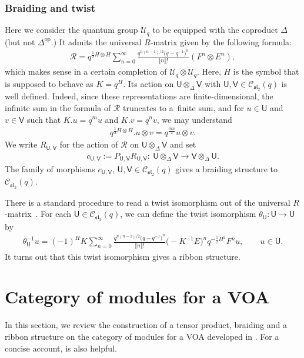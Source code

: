 \documentclass[pdftex]{sigma}
\numberwithin{equation}{section}
\newcommand{\op}{\mathrm{op}}
\newcommand{\cC}{\mathcal{C}}
\newcommand{\cR}{\mathcal{R}}
\newcommand{\cU}{\mathcal{U}}
\newcommand{\fsl}{\mathfrak{sl}}
\newcommand{\sfU}{\mathsf{U}}
\newcommand{\sfV}{\mathsf{V}}
\newcommand{\qint}[1]{\llbracket #1 \rrbracket}
\newcommand{\UEA}{\cU}
\newcommand{\Uq}{\UEA_{q}}
\newcommand{\QGcoprod}{\Delta}
\newcommand{\catQG}{\cC_{\fsl_{2}}}
\newcommand{\QGrepU}{\sfU}
\newcommand{\QGrepV}{\sfV}
\newcommand{\QGrepvec}{u}
\newcommand{\univR}{\cR}
\newcommand{\braid}{c}
\newcommand{\cattwist}{\theta}
\begin{document}
\subsubsection{Braiding and twist}
Here we consider the quantum group $\Uq$ to be equipped with the coproduct $\QGcoprod$ (but not $\QGcoprod^{\op}$.) It admits the universal $R$-matrix given by the following formula:
\begin{gather*}
 \cR=q^{\frac{1}{2}H\otimes H}\sum_{n=0}^{\infty}\frac{q^{n(n-1)/2}\big(q-q^{-1}\big)^{n}}{\qint{n}!}(F^{n}\otimes E^{n}),
\end{gather*}
which makes sense in a certain completion of $\Uq\otimes\Uq$.
Here, $H$ is the symbol that is supposed to behave as $K=q^{H}$.
Its action on $\QGrepU\otimes_{\QGcoprod}\QGrepV$ with $\QGrepU,\QGrepV\in \catQG(q)$ is well defined.
Indeed, since these representations are finite-dimensional, the infinite sum in the formula of $\univR$ truncates to a~finite sum, and for $u\in\QGrepU$ and $v\in \QGrepV$ such that $K.u=q^{m}u$ and $K.v=q^{n}v$, we may understand
\begin{gather*}
 q^{\frac{1}{2}H\otimes H}.u\otimes v=q^{\frac{mn}{2}}u\otimes v.
\end{gather*}
We write $R_{\QGrepU,\QGrepV}$ for the action of $\univR$ on $\QGrepU\otimes_{\QGcoprod}\QGrepV$
and set
\begin{gather*}
 \braid_{\QGrepU,\QGrepV}:=P_{\QGrepU,\QGrepV}R_{\QGrepU,\QGrepV}\colon\ \QGrepU\otimes_{\QGcoprod}\QGrepV\to\QGrepV\otimes_{\QGcoprod}\QGrepU.
\end{gather*}
The family of morphisms $\braid_{\QGrepU,\QGrepV}$, $\QGrepU,\QGrepV\in \catQG (q)$ gives a braiding structure to $\catQG (q)$.

There is a standard procedure to read a twist isomorphism out of the universal $R$-matrix~\cite[Chapter~XIV.6]{Kassel-quantum_groups}.
For each $\QGrepU\in\catQG (q)$, we can define the twist isomorphism $\cattwist_{\QGrepU}\colon \QGrepU\to \QGrepU$ by
\begin{gather}
\label{eq:QGtwist_inverse}
 \cattwist_{\QGrepU}^{-1}\QGrepvec=(-1)^{H}K\sum_{n=0}^{\infty}\frac{q^{n(n-1)/2}\big(q-q^{-1}\big)^{n}}{\qint{n}!}\big(-K^{-1}E\big)^{n}q^{-\frac{1}{2}H^{2}}F^{n}\QGrepvec,\qquad \QGrepvec\in\QGrepU.
\end{gather}
It turns out that this twist isomorphism gives a ribbon structure.


\section{Category of modules for a VOA}
\label{sect:module_cat_VOA}
In this section, we review the construction of a tensor product, braiding and a ribbon structure on the category of modules for a VOA developed in \cite{Huang1995,Huang2005,HuangLepowsky1992,HuangLepowsky1994,Huang--LepowskyI,Huang--LepowskyII,Huang--LepowskyIII,huang1999intertwining}.
For a concise account, \cite[Section 2]{Huang--Kirillov--Lepowsky} is also helpful.
\end{document}
